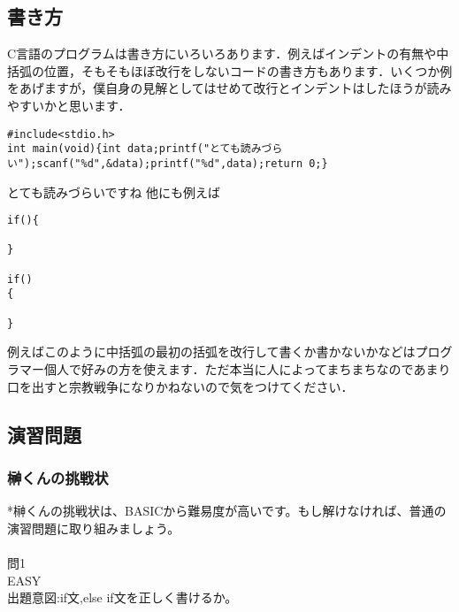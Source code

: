 \documentclass[a4j,titlepage,dvipdfmx]{jsarticle}   %
\begin{document}
\subsection{書き方}
C言語のプログラムは書き方にいろいろあります．例えばインデントの有無や中括弧の位置，そもそもほぼ改行をしないコードの書き方もあります．いくつか例をあげますが，僕自身の見解としてはせめて改行とインデントはしたほうが読みやすいかと思います．
\begin{lstlisting}
#include<stdio.h>
int main(void){int data;printf("とても読みづらい");scanf("%d",&data);printf("%d",data);return 0;}
\end{lstlisting}
とても読みづらいですね
他にも例えば
\begin{lstlisting}
if(){

}

if()
{

}
\end{lstlisting}
例えばこのように中括弧の最初の括弧を改行して書くか書かないかなどはプログラマー個人で好みの方を使えます．ただ本当に人によってまちまちなのであまり口を出すと宗教戦争になりかねないので気をつけてください．

\subsection{演習問題}

\subsubsection{榊くんの挑戦状}
*榊くんの挑戦状は、BASICから難易度が高いです。もし解けなければ、普通の演習問題に取り組みましょう。\\
\\
問1\\
EASY\\
出題意図:if文,else if文を正しく書けるか。\\
\end{document}
